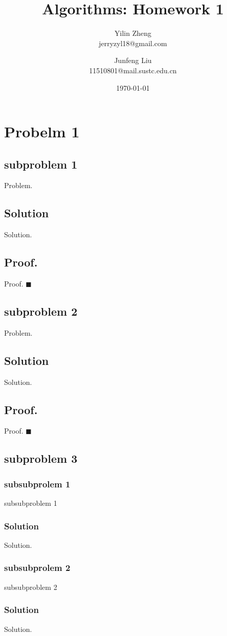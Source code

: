 \documentclass{article}
\title{\huge Algorithms: Homework 1}
\author{Yilin Zheng\\jerryzyl18@gmail.com \and Junfeng Liu\\11510801@mail.sustc.edu.cn}
\date{\today}
\begin{document}
\maketitle

\section*{Probelm 1}
\subsection*{subproblem 1}
  Problem.
\subsection*{Solution}
  Solution.
 \subsection*{Proof.}
  Proof.
 $ \blacksquare $
\subsection*{subproblem 2}
  Problem.
\subsection*{Solution}
  Solution.
 \subsection*{Proof.}
  Proof.
 $ \blacksquare $
\subsection*{subproblem 3}
  	\subsubsection*{subsubprolem 1}
  	subsubproblem 1
	\subsubsection*{Solution}
  	Solution.
  	\subsubsection*{subsubprolem 2}
  	subsubproblem 2
	\subsubsection*{Solution}
  	Solution.
\end{document}
